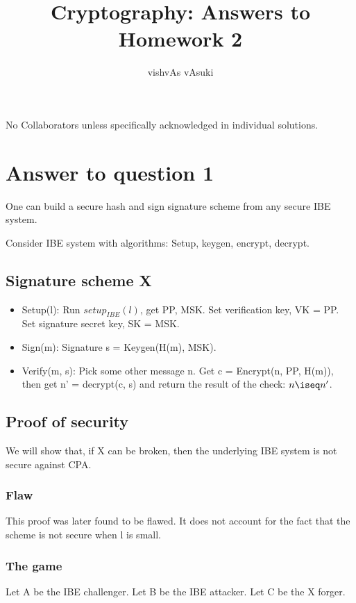 \documentclass[10pt]{amsart}
\title{Cryptography: Answers to Homework 2}
\author{vishvAs vAsuki}
\begin{document}
\maketitle

\begin{rem}
 No Collaborators unless specifically acknowledged in individual solutions.
\end{rem}


\section{Answer to question 1}
One can build a secure hash and sign signature scheme from any secure IBE system.

Consider IBE system with algorithms: Setup, keygen, encrypt, decrypt.

\subsection{Signature scheme X}
\begin{itemize}
 \item Setup(l): Run $setup_{IBE}(l)$, get PP, MSK. Set verification key, VK = PP. Set signature secret key, SK = MSK.
 \item Sign(m): Signature s = Keygen(H(m), MSK).
 \item Verify(m, s): Pick some other message n. Get c = Encrypt(n, PP, H(m)), then get n' = decrypt(c, s) and return the result of the check: $n \iseq n'$.
\end{itemize}

\subsection{Proof of security}

We will show that, if X can be broken, then the underlying IBE system is not secure against CPA.

\subsubsection{Flaw}
This proof was later found to be flawed. It does not account for the fact that the scheme is not secure when l is small.

\subsubsection{The game}
Let A be the IBE challenger. Let B be the IBE attacker. Let C be the X forger.
\end{document}
